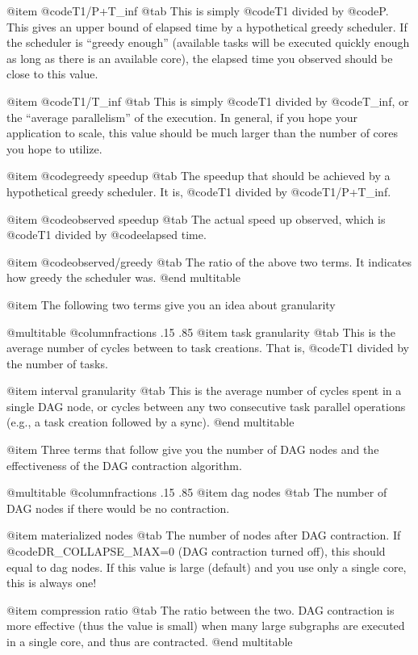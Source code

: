 @item @code{T1/P+T_inf} @tab
This is simply @code{T1} divided by @code{P}. 
This gives an upper bound of elapsed time by a hypothetical greedy
scheduler.  If the scheduler is ``greedy enough'' (available tasks
will be executed quickly enough as long as there is an available core),
the elapsed time you observed should be close to this value.

@item @code{T1/T_inf} @tab
This is simply @code{T1} divided by @code{T_inf}, 
or the ``average parallelism'' of the execution.  In general, if you
hope your application to scale, this value should be much larger than
the number of cores you hope to utilize.

@item @code{greedy speedup} @tab 
The speedup that should be achieved
by a hypothetical greedy scheduler.  It is, @code{T1} divided
by @code{T1/P+T_inf}.

@item @code{observed speedup} @tab 
The actual speed up observed,
which is @code{T1} divided by @code{elapsed time}.

@item @code{observed/greedy} @tab 
The ratio of the above two terms.
It indicates how greedy the scheduler was.
@end multitable

@item The following two terms give you an idea about granularity

@multitable @columnfractions .15 .85
@item task granularity @tab 
This is the average number of cycles
between to task creations.  That is, @code{T1} divided by
the number of tasks.

@item interval granularity @tab
This is the average number of cycles spent in a single DAG node,
or cycles between any two consecutive
task parallel operations (e.g., a task creation followed by a sync).
@end multitable

@item Three terms that follow give you the number of DAG nodes
and the effectiveness of the DAG contraction algorithm.

@multitable @columnfractions .15 .85
@item dag nodes @tab 
The number of DAG nodes if there would be no 
contraction.

@item materialized nodes @tab 
The number of nodes after DAG contraction.
If @code{DR_COLLAPSE_MAX=0} (DAG contraction turned off), this should
equal to dag nodes.  If this value is large (default) and you use
only a single core, this is always one!

@item compression ratio @tab
The ratio between the two.  DAG contraction
is more effective (thus the value is small) when many large subgraphs
are executed in a single core, and thus are contracted.
@end multitable

